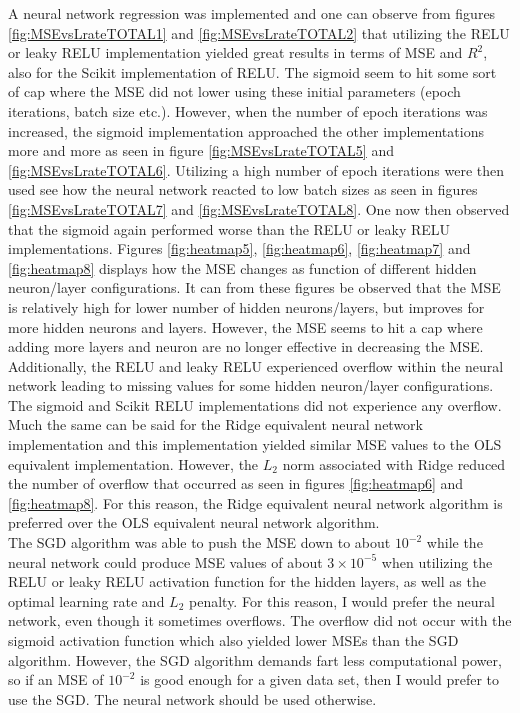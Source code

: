 \documentclass[12pt,a4paper]{article}
\begin{document}
A neural network regression was implemented and one can observe from figures \ref{fig:MSEvsLrateTOTAL1} and \ref{fig:MSEvsLrateTOTAL2} that utilizing the RELU or leaky RELU implementation yielded great results in terms of MSE and $R^2$, also for the Scikit implementation of RELU. The sigmoid seem to hit some sort of cap where the MSE did not lower using these initial parameters (epoch iterations, batch size etc.). However, when the number of epoch iterations was increased, the sigmoid implementation approached the other implementations more and more as seen in figure \ref{fig:MSEvsLrateTOTAL5} and \ref{fig:MSEvsLrateTOTAL6}. Utilizing a high number of epoch iterations were then used see how the neural network reacted to low batch sizes as seen in figures \ref{fig:MSEvsLrateTOTAL7} and \ref{fig:MSEvsLrateTOTAL8}. One now then observed that the sigmoid again performed worse than the RELU or leaky RELU implementations. Figures \ref{fig:heatmap5}, \ref{fig:heatmap6}, \ref{fig:heatmap7} and \ref{fig:heatmap8} displays how the MSE changes as function of different hidden neuron/layer configurations. It can from these figures be observed that the MSE is relatively high for lower number of hidden neurons/layers, but improves for more hidden neurons and layers. However, the MSE seems to hit a cap where adding more layers and neuron are no longer effective in decreasing the MSE. Additionally, the RELU and leaky RELU experienced overflow within the neural network leading to missing values for some hidden neuron/layer configurations. The sigmoid and Scikit RELU implementations did not experience any overflow.
\\
Much the same can be said for the Ridge equivalent neural network implementation and this implementation yielded similar MSE values to the OLS equivalent implementation. However, the $L_2$ norm associated with Ridge reduced the number of overflow that occurred as seen in figures \ref{fig:heatmap6} and \ref{fig:heatmap8}. For this reason, the Ridge equivalent neural network algorithm is preferred over the OLS equivalent neural network algorithm.
\\
The SGD algorithm was able to push the MSE down to about $10^{-2}$ while the neural network could produce MSE values of about $3 \times 10^{-5}$ when utilizing the RELU or leaky RELU activation function for the hidden layers, as well as the optimal learning rate and $L_2$ penalty. For this reason, I would prefer the neural network, even though it sometimes overflows. The overflow did not occur with the sigmoid activation function which also yielded lower MSEs than the SGD algorithm. However, the SGD algorithm demands fart less computational power, so if an MSE of $10^{-2}$ is good enough for a given data set, then I would prefer to use the SGD. The neural network should be used otherwise.
\end{document}
